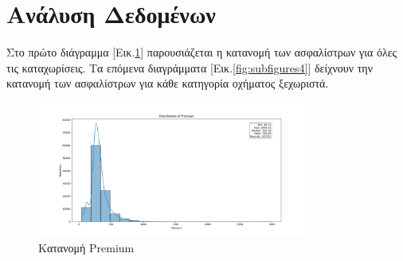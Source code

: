 \documentclass{llncs}
\begin{document}
\section{Ανάλυση Δεδομένων}
Στο πρώτο διάγραμμα [Εικ.\ref{fig:prem}] παρουσιάζεται η κατανομή των ασφαλίστρων για όλες τις καταχωρίσεις. Τα επόμενα διαγράμματα [Εικ.\ref{fig:subfigures4}] δείχνουν την κατανομή των ασφαλίστρων για κάθε κατηγορία οχήματος ξεχωριστά.
\begin{figure}
    \begin{center}
        \includegraphics[width=0.8\textwidth]{images/premium.png}
    \end{center}
    \caption{Κατανομή Premium} 
    \label{fig:prem}   
\end{figure}
\end{document}
